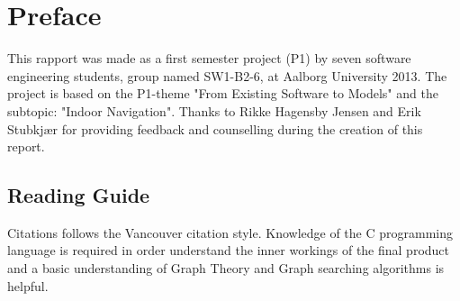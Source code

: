 \chapter*{Preface}
This rapport was made as a first semester project (P1) by seven software engineering students,
group named SW1-B2-6, at Aalborg University 2013. The project is based
on the P1-theme "From Existing Software to Models" and the subtopic: "Indoor Navigation".
Thanks to Rikke Hagensby Jensen and Erik Stubkjær for providing feedback and counselling during the creation of this report.

\section*{Reading Guide}
Citations follows the Vancouver citation style. Knowledge of the C programming language is required in
order understand the inner workings of the final product and a basic understanding of Graph Theory and Graph searching algorithms is helpful.